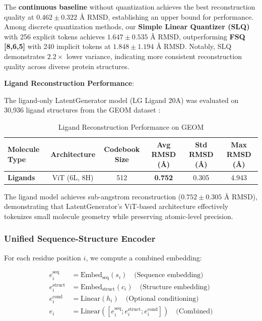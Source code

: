 \documentclass[11pt,a4paper]{article}
\begin{document}
The \textbf{continuous baseline} without quantization achieves the best reconstruction quality at $0.462 \pm 0.322$ Å RMSD, establishing an upper bound for performance. Among discrete quantization methods, our \textbf{Simple Linear Quantizer (SLQ)} with 256 explicit tokens achieves $1.647 \pm 0.535$ Å RMSD, outperforming \textbf{FSQ [8,6,5]} with 240 implicit tokens at $1.848 \pm 1.194$ Å RMSD. Notably, SLQ demonstrates $2.2\times$ lower variance, indicating more consistent reconstruction quality across diverse protein structures.

\textbf{Ligand Reconstruction Performance}:

The ligand-only LatentGenerator model (LG Ligand 20A) was evaluated on 30,936 ligand structures from the GEOM dataset \cite{axelrod2022}:

\begin{table}[h]
\centering
\caption{Ligand Reconstruction Performance on GEOM}
\begin{tabular}{@{}lccccc@{}}
\toprule
\textbf{Molecule Type} & \textbf{Architecture} & \textbf{Codebook Size} & \textbf{Avg RMSD (Å)} & \textbf{Std RMSD (Å)} & \textbf{Max RMSD (Å)} \\
\midrule
\textbf{Ligands} & ViT (6L, 8H) & 512 & \textbf{0.752} & 0.305 & 4.943 \\
\bottomrule
\end{tabular}
\label{tab:ligand_reconstruction}
\end{table}

The ligand model achieves sub-angstrom reconstruction ($0.752 \pm 0.305$ Å RMSD), demonstrating that LatentGenerator's ViT-based architecture effectively tokenizes small molecule geometry while preserving atomic-level precision.

\subsubsection{Unified Sequence-Structure Encoder}

For each residue position $i$, we compute a combined embedding:

\begin{align}
e_i^{\text{seq}} &= \text{Embed}_{\text{seq}}(s_i) \quad \text{(Sequence embedding)} \\
e_i^{\text{struct}} &= \text{Embed}_{\text{struct}}(c_i) \quad \text{(Structure embedding)} \\
e_i^{\text{cond}} &= \text{Linear}(h_i) \quad \text{(Optional conditioning)} \\
e_i &= \text{Linear}([e_i^{\text{seq}}; e_i^{\text{struct}}; e_i^{\text{cond}}]) \quad \text{(Combined)}
\end{align}
\end{document}
